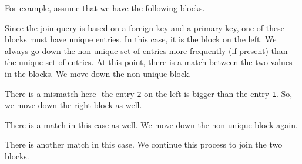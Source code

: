 \documentclass[a4paper, openany]{memoir}
\theoremstyle{definition}
\theoremstyle{plain}
\newcommand{\tuplesorted}[0]{
    \draw (0, 0) -- (1.5, 0)
    -- (1.5, -4)
    -- (0, -4)
    -- cycle;

    \foreach \x/\y[count=\i] in {1/2, 2/3, 2/5, 3/8, 5/9, 5/11, 5/12, 6/13} {
        \draw (0.75, -\i*0.5) -- (0.75, -\i*0.5 + 0.5);
        \draw (0, -\i*0.5) -- (1.5, -\i*0.5);
        \filldraw[blue!30, opacity=0.3] (0.75, -\i*0.5) -- (1.5, -\i*0.5)
            -- (1.5, -\i*0.5 + 0.5)
            -- (0.75, -\i*0.5 + 0.5)
            -- cycle;
        \filldraw[red!30, opacity=0.3] (0.75, -\i*0.5) -- (0, -\i*0.5)
            -- (0, -\i*0.5 + 0.5)
            -- (0.75, -\i*0.5 + 0.5)
            -- cycle;
        \node at (0.375, -\i*0.5 + 0.25) {\texttt{\x}};
        \node at (1.125, -\i*0.5 + 0.25) {\texttt{\y}};
    }

    \draw (4.5, 0) -- (5.25, 0)
        -- (5.25, -3)
        -- (4.5, -3)
        -- cycle;
        
    \foreach \i in {1, 2, ..., 6} {
        \draw (4.5, -\i * 0.5) -- (5.25, -\i * 0.5);
        \filldraw[red!30, opacity=0.3] (4.5, -\i*0.5) -- (5.25, -\i*0.5)
            -- (5.25, -\i*0.5 + 0.5)
            -- (4.5, -\i*0.5 + 0.5)
            -- cycle;
        \node at (4.875, -\i*0.5 + 0.25) {\texttt{\i}};
    }
}
\begin{document}
For example, assume that we have the following blocks.
\begin{figure}[H]
    \centering
\end{figure}
\noindent Since the join query is based on a foreign key and a primary key, one of these blocks must have unique entries. In this case, it is the block on the left. We always go down the non-unique set of entries more frequently (if present) than the unique set of entries. At this point, there is a match between the two values in the blocks. We move down the non-unique block.
\begin{figure}[H]
    \centering
\end{figure}
\noindent There is a mismatch here- the entry \texttt{2} on the left is bigger than the entry \texttt{1}. So, we move down the right block as well.
\begin{figure}[H]
    \centering
\end{figure}
\noindent There is a match in this case as well. We move down the non-unique block again.
\begin{figure}[H]
    \centering
\end{figure}
\noindent There is another match in this case. We continue this process to join the two blocks.
\end{document}
